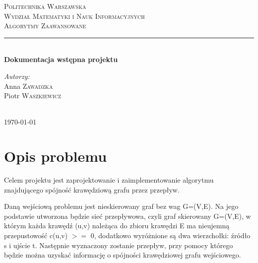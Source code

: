 \documentclass{article}
\begin{document}
	
\begin{titlepage}

\newcommand{\HRule}{\rule{\linewidth}{0.5mm}}

\center


\textsc{\LARGE Politechnika Warszawska}\\[5mm]
\textsc{\LARGE Wydział Matematyki i Nauk Informacyjnych}\\[4cm]
 

\textsc{\Huge Algorytmy Zaawansowane}\\[0.5cm]


\HRule \\[0.4cm]
{ \LARGE \bfseries Dokumentacja wstępna projektu}\\[2.5cm]
 

\begin{flushright}
\Large \emph{Autorzy:}\\[0.5cm]
Anna \textsc{Zawadzka}\\
Piotr \textsc{Waszkiewicz}\\
\end{flushright}
\\[4.5cm]

\vfill
{\large \today}\\[3cm]

\end{titlepage}
	
\newpage

\section{Opis problemu}

Celem projektu jest zaprojektowanie i zaimplementowanie algorytmu znajdującego spójność krawędziową grafu przez przepływ.

Daną wejściową problemu jest nieskierowany graf bez wag G=(V,E). Na jego podstawie utworzona będzie sieć przepływowa, czyli graf skierowany G=(V,E), w którym każda krawędź (u,v) należąca do zbioru krawędzi E ma nieujemną przepustowość c(u,v) $>=$ 0, dodatkowo wyróżnione są dwa wierzchołki: źródło s i ujście t. Następnie wyznaczony zostanie przepływ, przy pomocy którego będzie można uzyskać informację o spójności krawędziowej grafu wejściowego.
\end{document}
